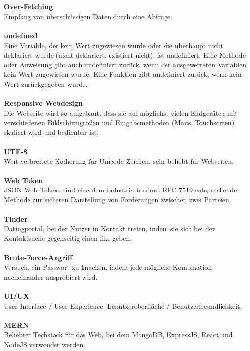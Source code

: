 \\\\
\textbf{Over-Fetching}\\
Empfang von überschüssigen Daten durch eine Abfrage.
\\\\
\textbf{undefined}\\
Eine Variable, der kein Wert zugewiesen wurde oder die überhaupt nicht deklariert wurde (nicht deklariert, existiert nicht), ist undefiniert. Eine Methode oder Anweisung gibt auch undefiniert zurück, wenn der ausgewerteten Variablen kein Wert zugewiesen wurde. Eine Funktion gibt undefiniert zurück, wenn kein Wert zurückgegeben wurde.
\\\\
\textbf{Responsive Webdesign}\\
Die Webseite wird so aufgebaut, dass sie auf möglichst vielen Endgeräten mit verschiedenen Bildschirmgrößen und Eingabemethoden (Maus, Touchscreen) skaliert wird und bedienbar ist.
\\\\
\textbf{UTF-8}\\
Weit verbreitete Kodierung für Unicode-Zeichen, sehr beliebt für Webseiten.
\\\\
\textbf{Web Token}\\
JSON-Web-Tokens sind eine dem Industriestandard RFC 7519 entsprechende Methode zur sicheren Darstellung von Forderungen zwischen zwei Parteien.
\\\\
\textbf{Tinder}\\
Datingportal, bei der Nutzer in Kontakt treten, indem sie sich bei der Kontaktsuche gegenseitig einen like geben.
\\\\
\textbf{Brute-Force-Angriff}\\
Versuch, ein Passwort zu knacken, indem jede mögliche Kombination nacheinander ausprobiert wird.
\\\\
\textbf{UI/UX}\\
User Interface / User Experience. Benutzeroberfläche / Benutzerfreundlichkeit.
\\\\
\textbf{MERN}\\
Beliebter Techstack für das Web, bei dem MongoDB, ExpressJS, React und NodeJS verwendet werden.
\\\\
